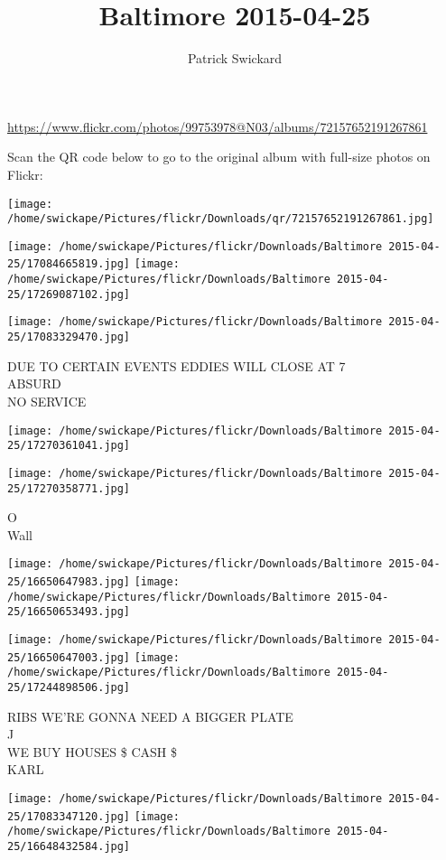 \documentclass[10pt,letterpaper]{article}
\title{Baltimore 2015-04-25}
\author{Patrick Swickard}
\date{}
\begin{document}
\maketitle

\url{https://www.flickr.com/photos/99753978@N03/albums/72157652191267861}

Scan the QR code below to go to the original album with full-size photos on Flickr:

\texttt{[image: /home/swickape/Pictures/flickr/Downloads/qr/72157652191267861.jpg]}
\pagebreak

\texttt{[image: /home/swickape/Pictures/flickr/Downloads/Baltimore 2015-04-25/17084665819.jpg]}
\texttt{[image: /home/swickape/Pictures/flickr/Downloads/Baltimore 2015-04-25/17269087102.jpg]}

\texttt{[image: /home/swickape/Pictures/flickr/Downloads/Baltimore 2015-04-25/17083329470.jpg]}

DUE TO CERTAIN EVENTS EDDIES WILL CLOSE AT 7\\
ABSURD\\
NO SERVICE
\pagebreak

\texttt{[image: /home/swickape/Pictures/flickr/Downloads/Baltimore 2015-04-25/17270361041.jpg]}

\vspace{0.25in}
\texttt{[image: /home/swickape/Pictures/flickr/Downloads/Baltimore 2015-04-25/17270358771.jpg]}

O\\
Wall
\pagebreak

\texttt{[image: /home/swickape/Pictures/flickr/Downloads/Baltimore 2015-04-25/16650647983.jpg]}
\texttt{[image: /home/swickape/Pictures/flickr/Downloads/Baltimore 2015-04-25/16650653493.jpg]}

\texttt{[image: /home/swickape/Pictures/flickr/Downloads/Baltimore 2015-04-25/16650647003.jpg]}
\texttt{[image: /home/swickape/Pictures/flickr/Downloads/Baltimore 2015-04-25/17244898506.jpg]}

RIBS WE'RE GONNA NEED A BIGGER PLATE\\
J\\
WE BUY HOUSES \$ CASH \$\\
KARL
\pagebreak

\texttt{[image: /home/swickape/Pictures/flickr/Downloads/Baltimore 2015-04-25/17083347120.jpg]}
\texttt{[image: /home/swickape/Pictures/flickr/Downloads/Baltimore 2015-04-25/16648432584.jpg]}
\end{document}
